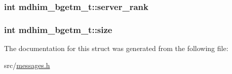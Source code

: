 \hypertarget{structmdhim__bgetm__t_a33b8bbb7a13cf0773954c22b18cac4f4}{
\subsubsection[{server\-\_\-rank}]{\setlength{\rightskip}{0pt plus 5cm}int mdhim\-\_\-bgetm\-\_\-t\-::server\-\_\-rank}}\label{d5/def/structmdhim__bgetm__t_a33b8bbb7a13cf0773954c22b18cac4f4}
\hypertarget{structmdhim__bgetm__t_aa2fc1aff991240e630c426100b3ee7c0}{
\subsubsection[{size}]{\setlength{\rightskip}{0pt plus 5cm}int mdhim\-\_\-bgetm\-\_\-t\-::size}}\label{d5/def/structmdhim__bgetm__t_aa2fc1aff991240e630c426100b3ee7c0}


The documentation for this struct was generated from the following file\-:\begin{DoxyCompactItemize}
\item 
src/\hyperlink{messages_8h}{messages.\-h}\end{DoxyCompactItemize}
